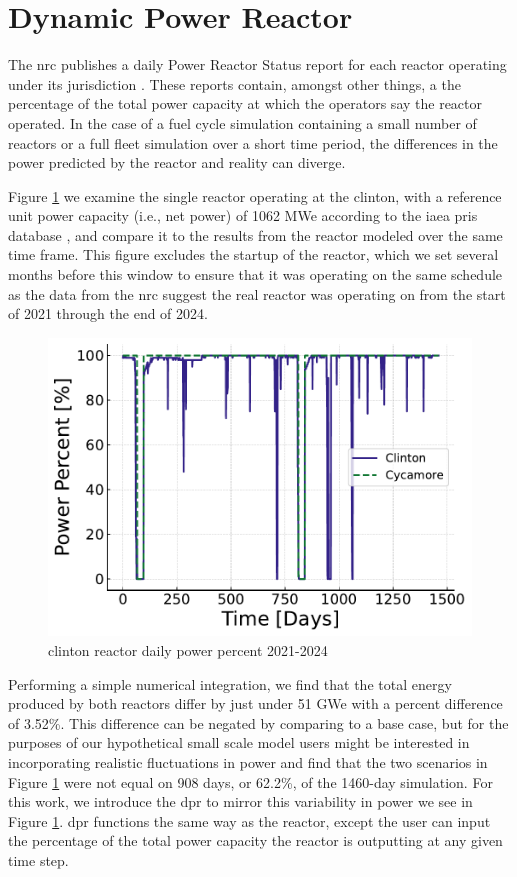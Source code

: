 \section{Dynamic Power Reactor}
\label{sec:dpr_method}

The \gls{nrc} publishes a daily Power Reactor Status report for each reactor operating under its jurisdiction \cite{nrc_power_2025}. These reports contain, amongst other things, a the percentage of the total power capacity at which the operators say the reactor operated. In the case of a fuel cycle simulation containing a small number of reactors or a full fleet simulation over a short time period, the differences in the power predicted by the \cycamore reactor and reality can diverge.

Figure \ref{fig:pp_full} we examine the single reactor operating at the \gls{clinton}, with a reference unit power capacity (i.e., net power) of 1062 MWe according to the \gls{iaea} \gls{pris} database \cite{IAEA_PRIS}, and compare it to the results from the \cycamore reactor modeled over the same time frame. This figure excludes the startup of the \cycamore reactor, which we set several months before this window to ensure that it was operating on the same schedule as the data from the \gls{nrc} suggest the real reactor was operating on from the start of 2021 through the end of 2024.

\begin{figure}[H]
  \centering
  \includegraphics[width=0.7\linewidth]{images/power_reactor/power_percent_clinton_fake.pdf}
  \caption{\gls{clinton} reactor daily power percent 2021-2024}
  \label{fig:pp_full}
\end{figure}

Performing a simple numerical integration, we find that the total energy produced by both reactors differ by just under 51 GWe with a percent difference of 3.52\%. This difference can be negated by comparing to a base case, but for the purposes of our hypothetical small scale model users might be interested in incorporating realistic fluctuations in power and find that the two scenarios in Figure \ref{fig:pp_full} were not equal on 908 days, or 62.2\%, of the 1460-day simulation. For this work, we introduce the \gls{dpr} to mirror this variability in power we see in Figure \ref{fig:pp_full}. \gls{dpr} functions the same way as the \cycamore reactor, except the user can input the percentage of the total power capacity the reactor is outputting at any given time step.


